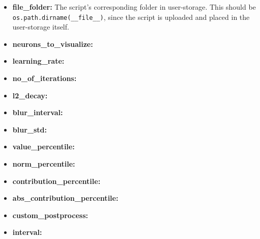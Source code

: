 \begin{itemize}
    \item \textbf{file\_folder:} The script's corresponding folder in user-storage. This should be \\
    \texttt{os.path.dirname(\_\_file\_\_)}, since the script is uploaded and placed in the user-storage itself.
    \item \textbf{neurons\_to\_visualize:}
    \item \textbf{learning\_rate:}
    \item \textbf{no\_of\_iterations:}
    \item \textbf{l2\_decay:}
    \item \textbf{blur\_interval:}
    \item \textbf{blur\_std:}
    \item \textbf{value\_percentile:}
    \item \textbf{norm\_percentile:}
    \item \textbf{contribution\_percentile:}
    \item \textbf{abs\_contribution\_percentile:}
    \item \textbf{custom\_postprocess:}
    \item \textbf{interval:}
\end{itemize}

\cleardoublepage